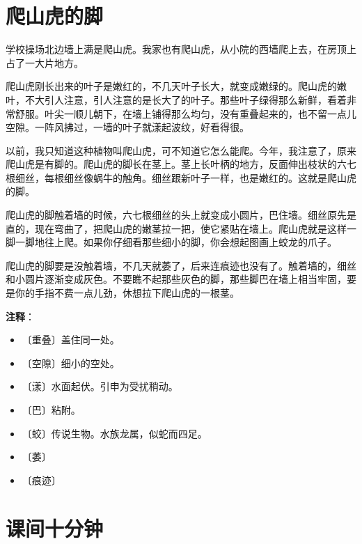 \documentclass[12pt,UTF-8,openany]{ctexbook}
\begin{document}
\chapter{爬山虎的脚}

\begin{Large}
    
    学校操场北边墙上满是爬山虎。我家也有爬山虎，从小院的西墙爬上去，在房顶上占了一大片地方。
    
    爬山虎刚长出来的叶子是嫩红的，不几天叶子长大，就变成嫩绿的。爬山虎的嫩叶，不大引人注意，引人注意的是长大了的叶子。那些叶子绿得那么新鲜，看着非常舒服。叶尖一顺儿朝下，在墙上铺得那么均匀，没有重叠起来的，也不留一点儿空隙。一阵风拂过，一墙的叶子就漾起波纹，好看得很。
    
    以前，我只知道这种植物叫爬山虎，可不知道它怎么能爬。今年，我注意了，原来爬山虎是有脚的。爬山虎的脚长在茎上。茎上长叶柄的地方，反面伸出枝状的六七根细丝，每根细丝像蜗牛的触角。细丝跟新叶子一样，也是嫩红的。这就是爬山虎的脚。
    
    爬山虎的脚触着墙的时候，六七根细丝的头上就变成小圆片，巴住墙。细丝原先是直的，现在弯曲了，把爬山虎的嫩茎拉一把，使它紧贴在墙上。爬山虎就是这样一脚一脚地往上爬。如果你仔细看那些细小的脚，你会想起图画上蛟龙的爪子。
    
    爬山虎的脚要是没触着墙，不几天就萎了，后来连痕迹也没有了。触着墙的，细丝和小圆片逐渐变成灰色。不要瞧不起那些灰色的脚，那些脚巴在墙上相当牢固，要是你的手指不费一点儿劲，休想拉下爬山虎的一根茎。
    
\end{Large}


\newpage

\textbf{注释}：

\vspace{-1em}

\begin{itemize}
    \setlength\itemsep{-0.2em}
    \item 〔重叠〕盖住同一处。
    \item 〔空隙〕细小的空处。
    \item 〔漾〕水面起伏。引申为受扰稍动。
    \item 〔巴〕粘附。
    \item 〔蛟〕传说生物。水族龙属，似蛇而四足。
    \item 〔萎〕
    \item 〔痕迹〕
\end{itemize}

\chapter{课间十分钟}
\end{document}
